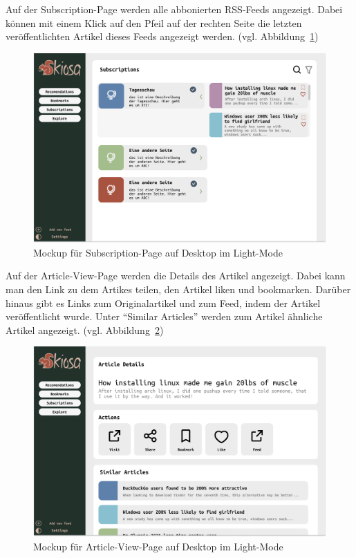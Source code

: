 Auf der Subscription-Page werden alle abbonierten RSS-Feeds angezeigt. Dabei können mit einem Klick auf den Pfeil auf der rechten Seite die letzten veröffentlichten Artikel dieses Feeds angezeigt werden. (vgl. Abbildung~\ref{fig:Subscription Interface Desktop Light})

\begin{figure}[H]
    \includegraphics[width=\linewidth]{images/Subscription Interface Desktop Lightfigma-mockups.png}
    \caption{Mockup für Subscription-Page auf Desktop im Light-Mode}
    \label{fig:Subscription Interface Desktop Light}
\end{figure}

Auf der Article-View-Page werden die Details des Artikel angezeigt. Dabei kann man den Link zu dem Artikes teilen, den Artikel liken und bookmarken. 
Darüber hinaus gibt es Links zum Originalartikel und zum Feed, indem der Artikel veröffentlicht wurde. Unter \enquote{Similar Articles} werden zum Artikel ähnliche Artikel angezeigt. (vgl. Abbildung~\ref{fig:View Page Desktop Light})

\begin{figure}[H]
    \includegraphics[width=\linewidth]{images/View Page Desktop Lightfigma-mockups.png}
    \caption{Mockup für Article-View-Page auf Desktop im Light-Mode}
    \label{fig:View Page Desktop Light}
\end{figure}

